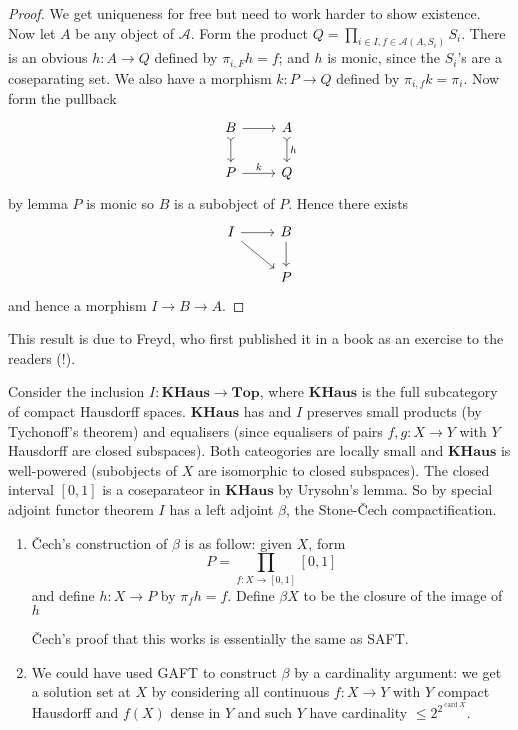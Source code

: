 \documentclass[a4paper]{article}
\renewcommand{\c}[1]{\mathbf{#1}}
\newcommand{\Top}{{\c{Top}}}
\begin{document}
\begin{proof}
  We get uniqueness for free but need to work harder to show existence. Now let \(A\) be any object of \(\mathcal A\). Form the product \(Q = \prod_{i \in I, f \in \mathcal A (A, S_i)} S_i\). There is an obvious \(h: A \to Q\) defined by \(\pi_{i, F} h = f\); and \(h\) is monic, since the \(S_i\)'s are a coseparating set. We also have a morphism \(k: P \to Q\) defined by \(\pi_{i, f} k = \pi_i\). Now form the pullback
   \[
     \begin{tikzcd}
       B \ar[r] \ar[d, rightarrowtail] & A \ar[d, "h", rightarrowtail] \\
       P \ar[r, "k"] & Q
     \end{tikzcd}
   \]
  by lemma \(P\) is monic so \(B\) is a subobject of \(P\). Hence there exists
  \[
    \begin{tikzcd}
      I \ar[r] \ar[dr] & B \ar[d] \\
      & P
    \end{tikzcd}
  \]
  and hence a morphism \(I \to B \to A\).
\end{proof}

This result is due to Freyd, who first published it in a book as an exercise to the readers (!).

\begin{eg}
  Consider the inclusion \(I: \c{KHaus} \to \Top\), where \(\c{KHaus}\) is the full subcategory of compact Hausdorff spaces. \(\c{KHaus}\) has and \(I\) preserves small products (by Tychonoff's theorem) and equalisers (since equalisers of pairs \(f, g: X \to Y\) with \(Y\) Hausdorff are closed subspaces). Both cateogories are locally small and \(\c{KHaus}\) is well-powered (subobjects of \(X\) are isomorphic to closed subspaces). The closed interval \([0, 1]\) is a coseparateor in \(\c{KHaus}\) by Urysohn's lemma. So by special adjoint functor theorem \(I\) has a left adjoint \(\beta\), the Stone-Čech compactification.
\end{eg}

\begin{remark}\leavevmode
  \begin{enumerate}
  \item %

  Čech's construction of \(\beta\) is as follow: given \(X\), form
  \[
    P = \prod_{f: X \to [0, 1]} [0, 1]
  \]
  and define \(h: X \to P\) by \(\pi_f h = f\). Define \(\beta X\) to be the closure of the image of \(h\)


  Čech's proof that this works is essentially the same as SAFT.
\item We could have used GAFT to construct \(\beta\) by a cardinality argument: we get a solution set at \(X\) by considering all continuous \(f: X \to Y\) with \(Y\) compact Hausdorff and \(f(X)\) dense in \(Y\) and such \(Y\) have cardinality \(\leq 2^{2^{\operatorname{card} X}}\).
  \end{enumerate}
\end{remark}
\end{document}
